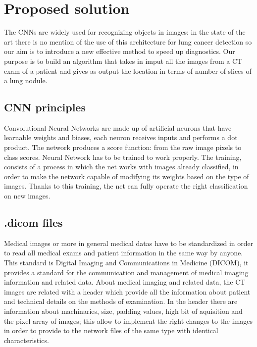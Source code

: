 \documentclass[../main.tex]{subfiles}
\begin{document}
\section{Proposed solution}
The CNNs are widely used for recognizing objects in images: in the state of the art there is no mention of the use of this architecture for lung cancer detection so our aim is to introduce a new effective method to speed up diagnostics.
Our purpose is to build an algorithm that takes in imput all the images from a CT exam of a patient and gives as output the location in terms of number of slices of a lung nodule.

\subsection{CNN principles}
Convolutional Neural Networks are made up of artificial neurons that have learnable weights and biases, each neuron receives inputs and performs a dot product. The network produces a score function: from the raw image pixels to class scores. 
Neural Network has to be trained to work properly. The training, consists of a process in which the net works with images already classified, in order to make the network capable of modifying its weights based on the type of images. Thanks to this training, the net can fully operate the right classification on new images.
\vspace{5mm}

\subsection{.dicom files}
Medical images or more in general medical datas have to be standardized in order to read all medical exams and patient information in the same way by anyone. This standard is Digital Imaging and Communications in Medicine (DICOM), it provides a standard for the communication and management of medical imaging information and related data.
About medical imaging and related data, the CT images are related with a header which provide all the information about patient and technical details on the methods of examination. In the header there are information about machinaries, size, padding values, high bit of aquisition and the pixel array of images; this allow to implement the right changes to the images in order to provide to the network files of the same type with identical characteristics.
\vspace{5mm}
\end{document}
